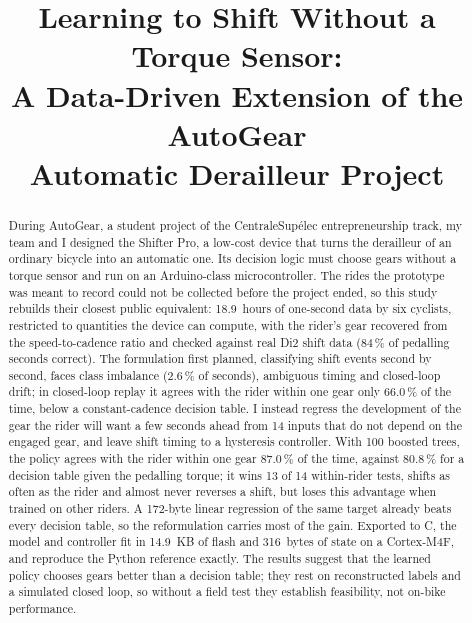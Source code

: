 \documentclass[conference]{IEEEtran}
\newcommand{\authorname}{Tancrède Amiel}
\newcommand{\pct}{\,\%}
\begin{document}
\title{Learning to Shift Without a Torque Sensor:\\ A Data-Driven Extension of the AutoGear\\ Automatic Derailleur Project}

\author{\IEEEauthorblockN{\authorname}
}

\maketitle

\begin{abstract}
During AutoGear, a student project of the CentraleSupélec entrepreneurship track, my team and I designed the Shifter Pro, a low-cost device that turns the derailleur of an ordinary bicycle into an automatic one. Its decision logic must choose gears without a torque sensor and run on an Arduino-class microcontroller. The rides the prototype was meant to record could not be collected before the project ended, so this study rebuilds their closest public equivalent: 18.9~hours of one-second data by six cyclists, restricted to quantities the device can compute, with the rider's gear recovered from the speed-to-cadence ratio and checked against real Di2 shift data (84\pct{} of pedalling seconds correct). The formulation first planned, classifying shift events second by second, faces class imbalance (2.6\pct{} of seconds), ambiguous timing and closed-loop drift; in closed-loop replay it agrees with the rider within one gear only 66.0\pct{} of the time, below a constant-cadence decision table. I instead regress the development of the gear the rider will want a few seconds ahead from 14 inputs that do not depend on the engaged gear, and leave shift timing to a hysteresis controller. With 100 boosted trees, the policy agrees with the rider within one gear 87.0\pct{} of the time, against 80.8\pct{} for a decision table given the pedalling torque; it wins 13 of 14 within-rider tests, shifts as often as the rider and almost never reverses a shift, but loses this advantage when trained on other riders. A 172-byte linear regression of the same target already beats every decision table, so the reformulation carries most of the gain. Exported to C, the model and controller fit in 14.9~KB of flash and 316~bytes of state on a Cortex-M4F, and reproduce the Python reference exactly. The results suggest that the learned policy chooses gears better than a decision table; they rest on reconstructed labels and a simulated closed loop, so without a field test they establish feasibility, not on-bike performance.
\end{abstract}
\end{document}
